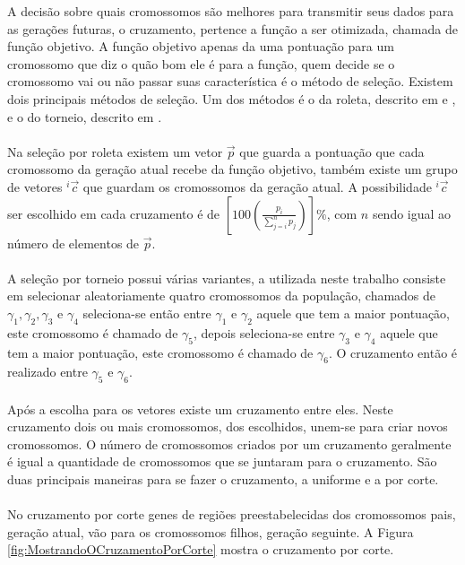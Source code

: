 \documentclass[10pt,a4paper]{article}
\begin{document}
A decisão sobre quais cromossomos são melhores para transmitir seus dados para as gerações futuras, o cruzamento, pertence a função a ser otimizada, chamada de função objetivo. A função objetivo apenas da uma pontuação para um cromossomo que diz o quão bom ele é para a função, quem decide se o cromossomo vai ou não passar suas característica é o método de seleção. Existem dois principais métodos de seleção. Um dos métodos é o da roleta, descrito em \cite{UFRGS-Apostila-GA} e \cite{Livro-De-IA}, e o do torneio, descrito em   \cite{Livro-De-IA} .\\ \\
 Na seleção por roleta existem um vetor $\vec{p}$ que guarda a pontuação que cada cromossomo da geração atual recebe da função objetivo, também existe um grupo de vetores  $^i\vec{c}$ que guardam os cromossomos da geração atual. A possibilidade  $^i\vec{c}$ ser escolhido em cada cruzamento é de $\left [100 \left ( \frac{p_{i}}{\sum \limits_{j=i}^{n} p_{j}}\right ) \right ]\%$, com $n$ sendo igual ao número de elementos de $\vec{p}$. \\ \\
A seleção por torneio possui várias variantes, a utilizada neste trabalho consiste em selecionar aleatoriamente quatro cromossomos da população, chamados de $\gamma_{1},\gamma_{2},\gamma_{3}$ e $\gamma_{4}$ seleciona-se então entre $\gamma_{1}$ e $\gamma_{2}$ aquele que tem a maior pontuação, este cromossomo é chamado de $\gamma_{5}$, depois seleciona-se  entre $\gamma_{3}$ e $\gamma_{4}$ aquele que tem a maior pontuação, este cromossomo é chamado de $\gamma_{6}$. O cruzamento então é realizado entre $\gamma_{5}$ e $\gamma_{6}$. \\ \\
Após a escolha para os vetores existe um cruzamento entre eles. Neste cruzamento dois ou mais cromossomos, dos escolhidos, unem-se para criar novos cromossomos. O número de cromossomos criados por um cruzamento geralmente é igual a quantidade de cromossomos que se juntaram para o cruzamento. São duas principais maneiras  para se fazer o cruzamento, a uniforme e a por corte. \\ \\
No cruzamento por corte genes de regiões preestabelecidas dos cromossomos pais, geração atual, vão para os cromossomos filhos, geração seguinte. A Figura \ref{fig:MostrandoOCruzamentoPorCorte} mostra o cruzamento por corte. \\ 
\end{document}
